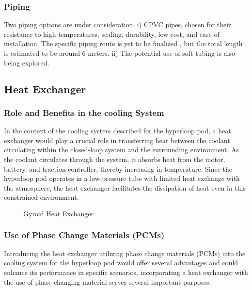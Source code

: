 \subsubsection{Piping}
Two piping options are under consideration.
 i) CPVC pipes, chosen for their resistance to high temperatures, scaling, durability, low cost, and ease of installation. The specific piping route is yet to be finalized , but the total length is estimated to be around 6 meters. 
ii) The potential use of soft tubing is also being explored.

\subsection{Heat Exchanger}
\subsubsection{Role and Benefits in the cooling System}
In the context of the cooling system described for the hyperloop pod, a heat exchanger would play a crucial role in transferring heat between the coolant circulating within the closed-loop system and the surrounding environment. As the coolant circulates through the system, it absorbs heat from the motor, battery, and traction controller, thereby increasing in temperature. Since the hyperloop pod operates in a low-pressure tube with limited heat exchange with the atmosphere, the heat exchanger facilitates the dissipation of heat even in this constrained environment.

\begin{figure}[ht]
  \centering
  \caption{Gyroid Heat Exchanger}
  \label{fig:HE}
\end{figure}


\subsubsection{Use of Phase Change Materials (PCMs)}
Introducing the heat exchanger utilizing phase change materials (PCMs) into the cooling system for the hyperloop pod would offer several advantages and could enhance its performance in specific scenarios, incorporating a heat exchanger with the use of phase changing material serves several important purposes:

